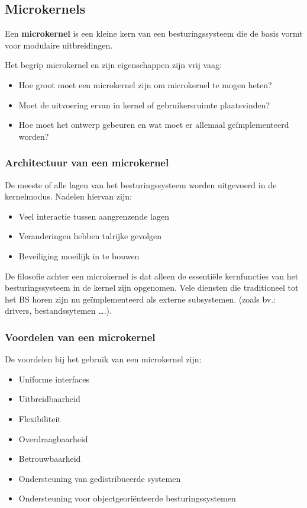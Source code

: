 \subsection{Microkernels}

Een \textbf{microkernel} is een kleine kern van een besturingssysteem die de basis vormt voor modulaire uitbreidingen.

Het begrip microkernel en zijn eigenschappen zijn vrij vaag:

\begin{itemize}
\item Hoe groot moet een microkernel zijn om microkernel te mogen heten?
\item Moet de uitvoering ervan in kernel of gebruikersruimte plaatsvinden?
\item Hoe moet het ontwerp gebeuren en wat moet er allemaal geïmplementeerd worden?
\end{itemize}

\subsubsection{Architectuur van een microkernel}

De meeste of alle lagen van het besturingssysteem worden uitgevoerd in de kernelmodus. Nadelen hiervan zijn:

\begin{itemize}
\item Veel interactie tussen aangrenzende lagen
\item Veranderingen hebben talrijke gevolgen
\item Beveiliging moeilijk in te bouwen
\end{itemize}

De filosofie achter een microkernel is dat alleen de essentiële kernfuncties van het besturingssysteem in de kernel zijn opgenomen. Vele diensten die traditioneel tot het BS horen zijn nu geïmplementeerd als externe subsystemen. (zoals bv.: drivers, bestandssytemen ….).

\subsubsection{Voordelen van een microkernel}

De voordelen bij het gebruik van een microkernel zijn:

\begin{itemize}
\item Uniforme interfaces
\item Uitbreidbaarheid
\item Flexibiliteit
\item Overdraagbaarheid
\item Betrouwbaarheid
\item Ondersteuning van gedistribueerde systemen
\item Ondersteuning voor objectgeoriënteerde besturingssystemen
\end{itemize}

